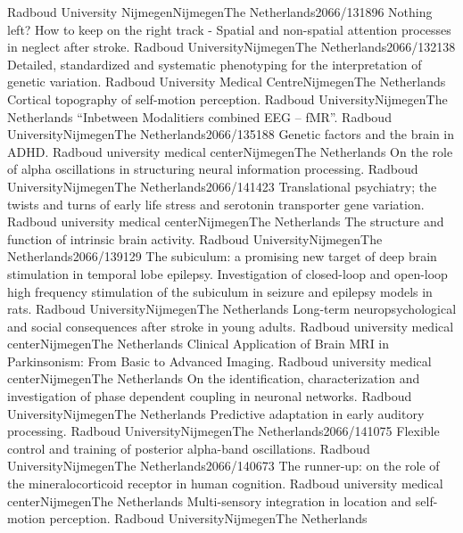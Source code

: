 	{Radboud University Nijmegen}{Nijmegen}{The Netherlands}{2066/131896}
	{Nothing left? How to keep on the right track - Spatial and non-spatial attention processes in neglect after stroke.}
	{Radboud University}{Nijmegen}{The Netherlands}{2066/132138}
	{Detailed, standardized and systematic phenotyping for the interpretation of genetic variation.}
	{Radboud University Medical Centre}{Nijmegen}{The Netherlands}{}
	{Cortical topography of self-motion perception.}
	{Radboud University}{Nijmegen}{The Netherlands}{}
	{“Inbetween Modalitiers combined EEG – fMR”.}
	{Radboud University}{Nijmegen}{The Netherlands}{2066/135188}
	{Genetic factors and the brain in ADHD.}
	{Radboud university medical center}{Nijmegen}{The Netherlands}{}
	{On the role of alpha oscillations in structuring neural information processing.}
	{Radboud University}{Nijmegen}{The Netherlands}{2066/141423}
	{Translational psychiatry; the twists and turns of early life stress and serotonin transporter gene variation.}
	{Radboud university medical center}{Nijmegen}{The Netherlands}{}
	{The structure and function of intrinsic brain activity.}
	{Radboud University}{Nijmegen}{The Netherlands}{2066/139129}
	{The subiculum: a promising new target of deep brain stimulation in temporal lobe epilepsy. Investigation of closed-loop and open-loop high frequency stimulation of the subiculum in seizure and epilepsy models in rats.}
	{Radboud University}{Nijmegen}{The Netherlands}{}
	{Long-term neuropsychological and social consequences after stroke in young adults.}
	{Radboud university medical center}{Nijmegen}{The Netherlands}{}
	{Clinical Application of Brain MRI in Parkinsonism: From Basic to Advanced Imaging.}
	{Radboud university medical center}{Nijmegen}{The Netherlands}{}
	{On the identification, characterization and investigation of phase dependent coupling in neuronal networks.}
	{Radboud University}{Nijmegen}{The Netherlands}{}
	{Predictive adaptation in early auditory processing.}
	{Radboud University}{Nijmegen}{The Netherlands}{2066/141075}
	{Flexible control and training of posterior alpha-band oscillations.}
	{Radboud University}{Nijmegen}{The Netherlands}{2066/140673}
	{The runner-up: on the role of the mineralocorticoid receptor in human cognition.}
	{Radboud university medical center}{Nijmegen}{The Netherlands}{}
	{Multi-sensory integration in location and self-motion perception.}
	{Radboud University}{Nijmegen}{The Netherlands}{}
